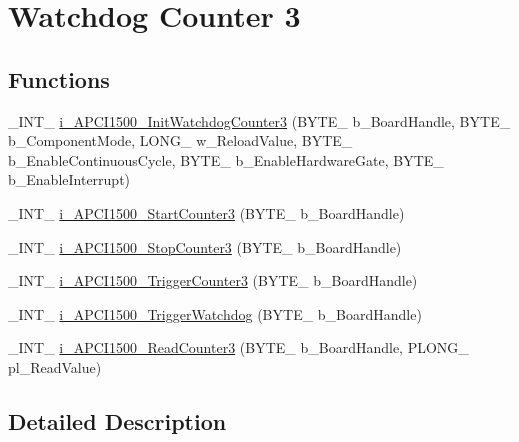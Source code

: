 \hypertarget{group___timer3_cmp_d_l_l}{}\section{Watchdog Counter 3}
\label{group___timer3_cmp_d_l_l}
\subsection*{Functions}
\begin{DoxyCompactItemize}
\item 
\+\_\+\+I\+N\+T\+\_\+ \mbox{\hyperlink{group___timer3_cmp_d_l_l_ga7dbe3d3d6971b8f52a027e3f4aaaf9c9}{i\+\_\+\+A\+P\+C\+I1500\+\_\+\+Init\+Watchdog\+Counter3}} (B\+Y\+T\+E\+\_\+ b\+\_\+\+Board\+Handle, B\+Y\+T\+E\+\_\+ b\+\_\+\+Component\+Mode, L\+O\+N\+G\+\_\+ w\+\_\+\+Reload\+Value, B\+Y\+T\+E\+\_\+ b\+\_\+\+Enable\+Continuous\+Cycle, B\+Y\+T\+E\+\_\+ b\+\_\+\+Enable\+Hardware\+Gate, B\+Y\+T\+E\+\_\+ b\+\_\+\+Enable\+Interrupt)
\item 
\+\_\+\+I\+N\+T\+\_\+ \mbox{\hyperlink{group___timer3_cmp_d_l_l_ga499faa7de742ffe653ff43e6acedeacb}{i\+\_\+\+A\+P\+C\+I1500\+\_\+\+Start\+Counter3}} (B\+Y\+T\+E\+\_\+ b\+\_\+\+Board\+Handle)
\item 
\+\_\+\+I\+N\+T\+\_\+ \mbox{\hyperlink{group___timer3_cmp_d_l_l_ga7844655b0eb2221fac8f591c3558f486}{i\+\_\+\+A\+P\+C\+I1500\+\_\+\+Stop\+Counter3}} (B\+Y\+T\+E\+\_\+ b\+\_\+\+Board\+Handle)
\item 
\+\_\+\+I\+N\+T\+\_\+ \mbox{\hyperlink{group___timer3_cmp_d_l_l_gae999f3267aa876cd628a9bbd8d4fe3bc}{i\+\_\+\+A\+P\+C\+I1500\+\_\+\+Trigger\+Counter3}} (B\+Y\+T\+E\+\_\+ b\+\_\+\+Board\+Handle)
\item 
\+\_\+\+I\+N\+T\+\_\+ \mbox{\hyperlink{group___timer3_cmp_d_l_l_ga7eb6e6fcb59c7568a98bd0f12d87c081}{i\+\_\+\+A\+P\+C\+I1500\+\_\+\+Trigger\+Watchdog}} (B\+Y\+T\+E\+\_\+ b\+\_\+\+Board\+Handle)
\item 
\+\_\+\+I\+N\+T\+\_\+ \mbox{\hyperlink{group___timer3_cmp_d_l_l_ga803e07c533414bd10ac69bc081ca7168}{i\+\_\+\+A\+P\+C\+I1500\+\_\+\+Read\+Counter3}} (B\+Y\+T\+E\+\_\+ b\+\_\+\+Board\+Handle, P\+L\+O\+N\+G\+\_\+ pl\+\_\+\+Read\+Value)
\end{DoxyCompactItemize}


\subsection{Detailed Description}


